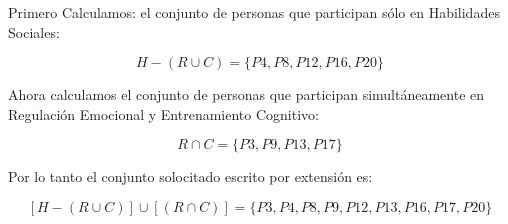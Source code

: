 \documentclass{article}
\begin{document}
	\quad 
	
	Primero Calculamos: el conjunto de personas que participan sólo en Habilidades Sociales:
	
	
	\[
	H-(R\cup C)=\{P4, P8, P12, P16, P20\}
	\]
	
	
	
	Ahora calculamos el conjunto de personas que participan simultáneamente en Regulación Emocional y Entrenamiento Cognitivo:
	
	\[
	R\cap C= \{P3, P9, P13, P17\}
	\]
	
	
	
	Por lo tanto el conjunto solocitado escrito por extensión es:
	
	
	\[
	 [H-(R\cup C)]\cup [(R\cap C)]= \{P3, P4, P8, P9, P12, P13, P16, P17, P20\}
	\]
	
\end{document}
